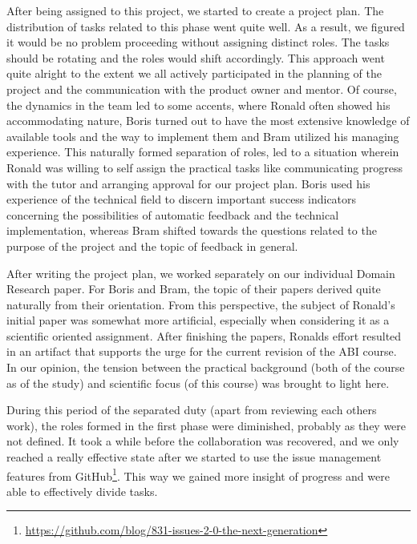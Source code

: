 After being assigned to this project, we started to create a project plan.
The distribution of tasks related to this phase went quite well. As a result,
we figured it would be no problem proceeding without assigning distinct
roles. The tasks should be rotating and the roles would shift accordingly.
This approach went quite alright to the extent we all actively participated in
the planning of the project and the communication with the product owner and 
mentor. Of course, the dynamics in the team led to some accents, where Ronald
often showed his accommodating nature, Boris turned out to have the most extensive
knowledge of available tools and the way to implement them and Bram utilized
his managing experience. This naturally formed separation of roles, led to a
situation wherein Ronald was willing to self assign the practical tasks like 
communicating progress with the tutor and arranging approval for our project 
plan. Boris used his experience of the technical field
to discern important success indicators concerning the possibilities of 
automatic feedback and the technical implementation,
whereas Bram shifted towards the questions related to the purpose of the project
and the topic of feedback in general. 

After writing the project plan, we worked separately on our individual Domain
Research paper. For Boris and Bram, the topic of their papers derived quite 
naturally from their orientation. From this perspective, the subject
of Ronald's initial paper was somewhat more artificial, especially
when considering it as a scientific oriented assignment. After finishing the 
papers, Ronalds effort resulted in an artifact that supports the urge for the
current revision of the ABI course. In our opinion, the tension
between the practical background (both of the course as of the study) and 
scientific focus (of this course) was brought to light here. 

During this period of the separated duty (apart from reviewing each others 
work), the roles formed in the first phase were diminished, probably as they 
were not defined. It took a while before the 
collaboration was recovered, and we only reached a really effective state after
we started to use the issue management features from
GitHub\footnote{\url{https://github.com/blog/831-issues-2-0-the-next-generation}}.
This way we gained more insight of progress and were able to effectively divide
tasks. 

